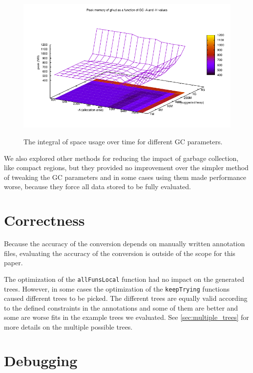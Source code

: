 \begin{figure}
      {\includegraphics[scale=0.5]{thesis/figure/gf-ud-peak-gc-space.pdf}}
    \caption{The integral of space usage over time for different GC parameters.}
    \label{fig:gf-ud-integ-gc-space}
\end{figure}

We also explored other methods for reducing the impact of garbage collection, like compact regions\cite{yang2015efficient}, but they provided no improvement over the simpler method of tweaking the GC parameters and in some cases using them made performance worse, because they force all data stored to be fully evaluated.

\section{Correctness}

Because the accuracy of the conversion depends on manually written annotation files, evaluating the accuracy of the conversion is outside of the scope for this paper.

The optimization of the \texttt{allFunsLocal} function had no impact on the generated trees. However, in some cases the optimization of the \texttt{keepTrying} functions caused different trees to be picked. The different trees are equally valid according to the defined constraints in the annotations and some of them are better and some are worse fits in the example trees we evaluated. See \autoref{sec:multiple_trees} for more details on the multiple possible trees.

\section{Debugging}

